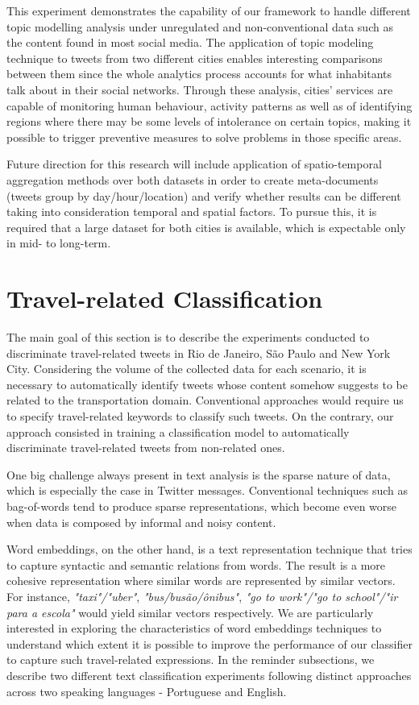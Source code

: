 This experiment demonstrates the capability of our framework to handle different topic modelling analysis under unregulated and non-conventional data such as the content found in most social media. The application of topic modeling technique to tweets from two different cities enables interesting comparisons between them since the whole analytics process accounts for what inhabitants talk about in their social networks. Through these analysis, cities' services are capable of monitoring human behaviour, activity patterns as well as of identifying regions where there may be some levels of intolerance on certain topics, making it possible to trigger preventive measures to solve problems in those specific areas.

Future direction for this research will include application of spatio-temporal aggregation methods over both datasets in order to create meta-documents (tweets group by day/hour/location) and verify whether results can be different taking into consideration temporal and spatial factors. To pursue this, it is required that a large dataset for both cities is available, which is expectable only in mid- to long-term.

\section{Travel-related Classification}
\label{sec:travel_related_classification}
The main goal of this section is to describe the experiments conducted to discriminate travel-related tweets in Rio de Janeiro, São Paulo and New York City. Considering the volume of the collected data for each scenario, it is necessary to automatically identify tweets whose content somehow suggests to be related to the transportation domain. Conventional approaches would require us to specify travel-related keywords to classify such tweets. On the contrary, our approach consisted in training a classification model to automatically discriminate travel-related tweets from non-related ones. 

One big challenge always present in text analysis is the sparse nature of data, which is especially the case in Twitter messages. Conventional techniques such as bag-of-words tend to produce sparse representations, which become even worse when data is composed by informal and noisy content.

Word embeddings, on the other hand, is a text representation technique that tries to capture syntactic and semantic relations from words. The result is a more cohesive representation where similar words are represented by similar vectors. For instance, \emph{"taxi"/"uber"}, \emph{"bus/busão/ônibus"}, \emph{"go to work"/"go to school"/"ir para a escola"} would yield similar vectors respectively.
We are particularly interested in exploring the characteristics of word embeddings techniques to understand which extent it is possible to improve the performance of our classifier to capture such travel-related expressions. In the reminder subsections, we describe two different text classification experiments following distinct approaches across two speaking languages - Portuguese and English.

